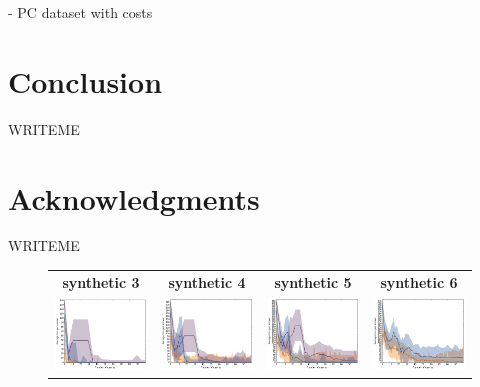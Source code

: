 \documentclass{article}
\renewcommand\[{\begin{equation}}
\renewcommand\]{\end{equation}}
\begin{document}
- PC dataset with costs

\section{Conclusion}

WRITEME

\section*{Acknowledgments}

WRITEME




\onecolumn

\begin{figure}[b]
    \centering
    \begin{tabular}{cccc}
        {\bf synthetic 3} & {\bf synthetic 4} & {\bf synthetic 5} & {\bf synthetic 6}
        \\
        \includegraphics[width=12em]{figures/synthetic_3_uniform_cv1_loss} &
        \includegraphics[width=12em]{figures/synthetic_4_uniform_cv1_loss} &
        \includegraphics[width=12em]{figures/synthetic_5_uniform_cv1_loss} &
        \includegraphics[width=12em]{figures/synthetic_6_uniform_cv1_loss}

\end{tabular}
\end{figure}
\end{document}
